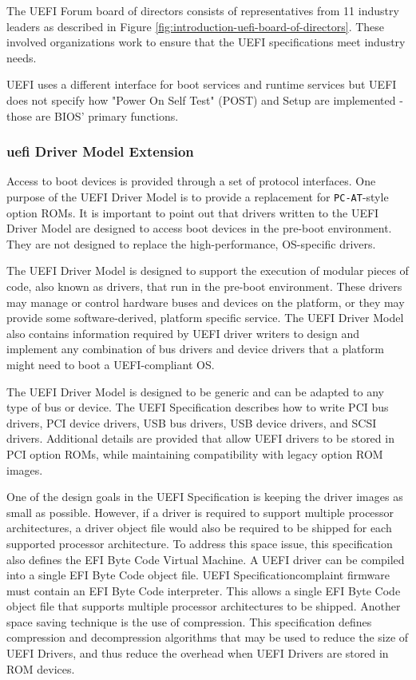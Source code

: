The UEFI Forum board of directors consists of representatives from 11 industry leaders as described in Figure \ref{fig:introduction-uefi-board-of-directors}. These involved organizations work to ensure that the UEFI specifications meet industry needs.

UEFI uses a different interface for boot services and runtime services but UEFI does not specify how "Power On Self Test" (POST) and Setup are implemented - those are BIOS' primary functions.

\subsubsection{\gls{uefi} Driver Model Extension}
Access to boot devices is provided through a set of protocol interfaces. One purpose of the
UEFI Driver Model is to provide a replacement for \verb|PC-AT|-style option ROMs. It is important
to point out that drivers written to the UEFI Driver Model are designed to access boot devices in
the pre-boot environment. They are not designed to replace the high-performance, OS-specific
drivers.

The UEFI Driver Model is designed to support the execution of modular pieces of code,
also known as drivers, that run in the pre-boot environment. These drivers may manage or control
hardware buses and devices on the platform, or they may provide some software-derived, platform specific service. The UEFI Driver Model also contains information required by UEFI driver writers to design and implement any combination of bus drivers and device drivers that a platform
might need to boot a UEFI-compliant OS.

The UEFI Driver Model is designed to be generic and can be adapted to any type of bus or
device. The UEFI Specification describes how to write PCI bus drivers, PCI device drivers, USB
bus drivers, USB device drivers, and SCSI drivers. Additional details are provided that allow UEFI
drivers to be stored in PCI option ROMs, while maintaining compatibility with legacy option ROM
images.

One of the design goals in the UEFI Specification is keeping the driver images as small as
possible. However, if a driver is required to support multiple processor architectures, a driver
object file would also be required to be shipped for each supported processor architecture. To
address this space issue, this specification also defines the EFI Byte Code Virtual Machine. A
UEFI driver can be compiled into a single EFI Byte Code object file. UEFI Specificationcomplaint firmware must contain an EFI Byte Code interpreter. This allows a single EFI Byte
Code object file that supports multiple processor architectures to be shipped. Another space saving
technique is the use of compression. This specification defines compression and decompression
algorithms that may be used to reduce the size of UEFI Drivers, and thus reduce the overhead
when UEFI Drivers are stored in ROM devices.

